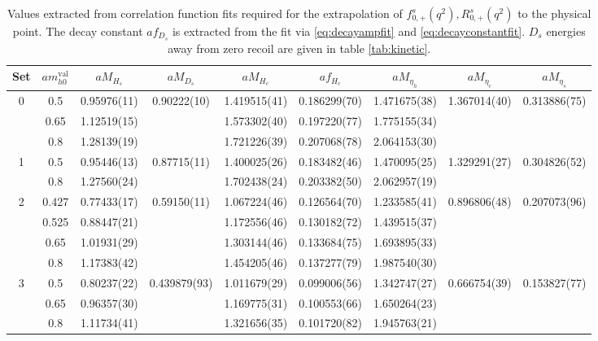 \begin{table}
  \begin{center}
    \begin{tabular}{ c c c c c c c c c }
      \hline 
      Set & $am_{h0}^{\text{val}}$ & $aM_{H_s}$ & $aM_{D_s}$ &  $aM_{H_c}$ & $af_{H_c}$ & $aM_{\eta_h}$ & $aM_{\eta_c}$ & $aM_{\eta_s}$ \\ [0.5ex]
      \hline 
      0 &0.5 &0.95976(11) &0.90222(10) &1.419515(41) &0.186299(70) &1.471675(38) &1.367014(40) &0.313886(75) \\ [0.5ex] &0.65 &1.12519(15) && 1.573302(40) &0.197220(77) &1.775155(34) &&  \\ [0.5ex] &0.8 &1.28139(19) && 1.721226(39) &0.207068(78) &2.064153(30) &&  \\ [0.5ex]
      \hline 
      1 &0.5 &0.95446(13) &0.87715(11) &1.400025(26) &0.183482(46) &1.470095(25) &1.329291(27) &0.304826(52) \\ [0.5ex] &0.8 &1.27560(24) && 1.702438(24) &0.203382(50) &2.062957(19) &&  \\ [0.5ex]
      \hline 
      2 &0.427 &0.77433(17) &0.59150(11) &1.067224(46) &0.126564(70) &1.233585(41) &0.896806(48) &0.207073(96) \\ [0.5ex] &0.525 &0.88447(21) && 1.172556(46) &0.130182(72) &1.439515(37) &&  \\ [0.5ex] &0.65 &1.01931(29) && 1.303144(46) &0.133684(75) &1.693895(33) &&  \\ [0.5ex] &0.8 &1.17383(42) && 1.454205(46) &0.137277(79) &1.987540(30) &&  \\ [0.5ex]
      \hline 
      3 &0.5 &0.80237(22) &0.439879(93) &1.011679(29) &0.099006(56) &1.342747(27) &0.666754(39) &0.153827(77) \\ [0.5ex] &0.65 &0.96357(30) && 1.169775(31) &0.100553(66) &1.650264(23) &&  \\ [0.5ex] &0.8 &1.11734(41) && 1.321656(35) &0.101720(82) &1.945763(21) &&  \\ [0.5ex]
      \hline
    \end{tabular}
    \caption{Values extracted from correlation function fits required for the extrapolation of $f^s_{0,+}(q^2),R^s_{0,+}(q^2)$ to the physical point. The decay constant $af_{D_s}$ is extracted from the fit via \eqref{eq:decayampfit} and \eqref{eq:decayconstantfit}. $D_s$ energies away from zero recoil are given in table \ref{tab:kinetic}. \label{tab:masses}}
  \end{center}
\end{table}

